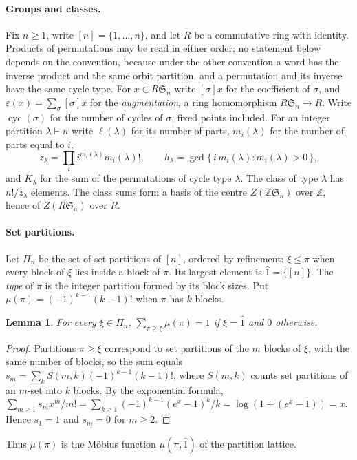 \documentclass[11pt,a4paper]{article}
\newtheorem{lemma}[theorem]{Lemma}
\theoremstyle{definition}
\newcommand{\Sn}{\mathfrak S}
\newcommand{\Z}{\mathbb Z}
\newcommand{\Pa}{\Pi}
\DeclareMathOperator{\cyc}{cyc}
\begin{document}
\paragraph{Groups and classes.} Fix $n\ge1$, write $[n]=\{1,\ldots,n\}$, and let $R$ be a commutative ring with identity. Products of permutations may be read in either order; no statement below depends on the convention, because under the other convention a word has the inverse product and the same orbit partition, and a permutation and its inverse have the same cycle type. For $x\in R\Sn_n$ write $[\sigma]x$ for the coefficient of $\sigma$, and $\varepsilon(x)=\sum_\sigma[\sigma]x$ for the \emph{augmentation}, a ring homomorphism $R\Sn_n\to R$. Write $\cyc(\sigma)$ for the number of cycles of $\sigma$, fixed points included. For an integer partition $\lambda\vdash n$ write $\ell(\lambda)$ for its number of parts, $m_i(\lambda)$ for the number of parts equal to $i$,
\[
 z_\lambda=\prod_i i^{m_i(\lambda)}m_i(\lambda)!,\qquad h_\lambda=\gcd\{\,i\,m_i(\lambda): m_i(\lambda)>0\,\},
\]
and $K_\lambda$ for the sum of the permutations of cycle type $\lambda$. The class of type $\lambda$ has $n!/z_\lambda$ elements. The class sums form a basis of the centre $Z(\Z\Sn_n)$ over $\Z$, hence of $Z(R\Sn_n)$ over $R$.

\paragraph{Set partitions.} Let $\Pa_n$ be the set of set partitions of $[n]$, ordered by refinement: $\xi\le\pi$ when every block of $\xi$ lies inside a block of $\pi$. Its largest element is $\hat1=\{[n]\}$. The \emph{type} of $\pi$ is the integer partition formed by its block sizes. Put $\mu(\pi)=(-1)^{k-1}(k-1)!$ when $\pi$ has $k$ blocks.

\begin{lemma}\label{lem:mu}
For every $\xi\in\Pa_n$, $\sum_{\pi\ge\xi}\mu(\pi)=1$ if $\xi=\hat1$ and $0$ otherwise.
\end{lemma}
\begin{proof}
Partitions $\pi\ge\xi$ correspond to set partitions of the $m$ blocks of $\xi$, with the same number of blocks, so the sum equals $s_m=\sum_kS(m,k)(-1)^{k-1}(k-1)!$, where $S(m,k)$ counts set partitions of an $m$-set into $k$ blocks. By the exponential formula, $\sum_{m\ge1}s_mx^m/m!=\sum_{k\ge1}(-1)^{k-1}(e^x-1)^k/k=\log(1+(e^x-1))=x$. Hence $s_1=1$ and $s_m=0$ for $m\ge2$.
\end{proof}
Thus $\mu(\pi)$ is the M\"obius function $\mu(\pi,\hat1)$ of the partition lattice.
\end{document}
